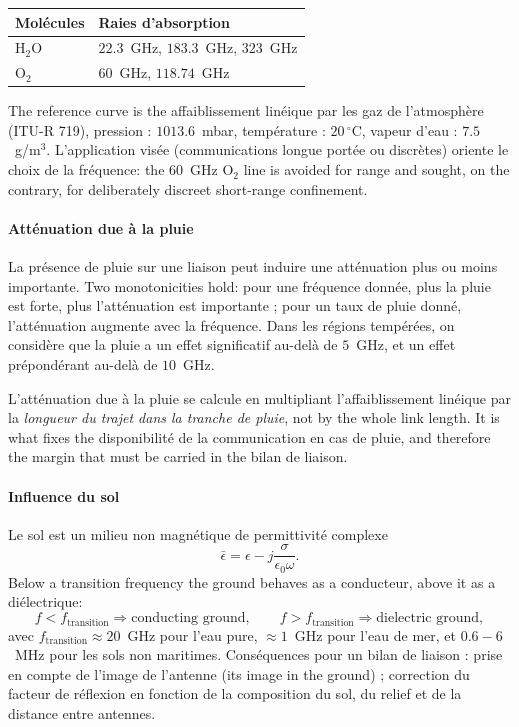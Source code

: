 \begin{center}
  \begin{tabular}{@{}ll@{}}
    \toprule
    Molécules & Raies d'absorption \\
    \midrule
    H$_2$O & $22.3$~GHz, $183.3$~GHz, $323$~GHz \\
    O$_2$  & $60$~GHz, $118.74$~GHz \\
    \bottomrule
  \end{tabular}
\end{center}

The reference curve is the affaiblissement linéique par les gaz de
l'atmosphère (ITU-R 719), pression : $1013.6$~mbar, température :
$20\,^\circ$C, vapeur d'eau : $7.5$~g/m$^3$. L'application visée
(communications longue portée ou discrètes) oriente le choix de la fréquence:
the $60$~GHz O$_2$ line is avoided for range and sought, on the contrary, for
deliberately discreet short-range confinement.

\paragraph{Atténuation due à la pluie} La présence de pluie sur une liaison
peut induire une atténuation plus ou moins importante. Two monotonicities hold:
pour une fréquence donnée, plus la pluie est forte, plus l'atténuation est
importante ; pour un taux de pluie donné, l'atténuation augmente avec la
fréquence. Dans les régions tempérées, on considère que la pluie a un effet
significatif au-delà de $5$~GHz, et un effet prépondérant au-delà de $10$~GHz.

\begin{remark}
  L'atténuation due à la pluie se calcule en multipliant l'affaiblissement
  linéique par la \emph{longueur du trajet dans la tranche de pluie}, not by
  the whole link length. It is what fixes the disponibilité de la communication
  en cas de pluie, and therefore the margin that must be carried in the bilan
  de liaison.
\end{remark}

\paragraph{Influence du sol} Le sol est un milieu non magnétique de permittivité
complexe
\[ \bar{\epsilon} = \epsilon - j \frac{\sigma}{\epsilon_0 \omega}. \]
Below a transition frequency the ground behaves as a conducteur, above it as a
diélectrique:
\[ f < f_{\mathrm{transition}} \Rightarrow \text{conducting ground}, \qquad
   f > f_{\mathrm{transition}} \Rightarrow \text{dielectric ground}, \]
avec $f_{\mathrm{transition}} \approx 20$~GHz pour l'eau pure, $\approx 1$~GHz
pour l'eau de mer, et $0.6 - 6$~MHz pour les sols non maritimes. Conséquences
pour un bilan de liaison : prise en compte de l'image de l'antenne (its image
in the ground) ; correction
du facteur de réflexion en fonction de la composition du sol, du relief et de
la distance entre antennes.

